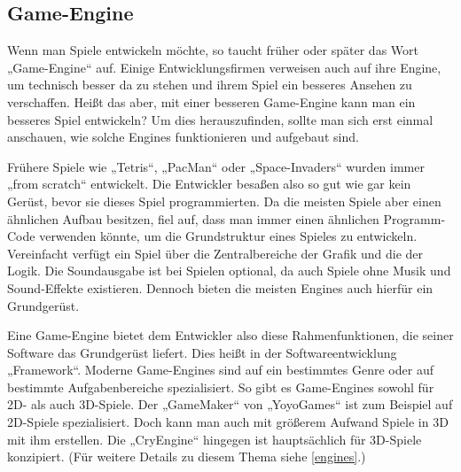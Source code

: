 \subsection{Game-Engine}	
\label{engine}
Wenn man Spiele entwickeln möchte, so taucht früher oder später das Wort „Game-Engine“ auf. Einige Entwicklungsfirmen verweisen auch auf ihre Engine, um technisch besser da zu stehen und ihrem Spiel ein besseres Ansehen zu verschaffen. Heißt das aber, mit einer besseren Game-Engine kann man ein besseres Spiel entwickeln? Um dies herauszufinden, sollte man sich erst einmal anschauen, wie solche Engines funktionieren und aufgebaut sind.

Frühere Spiele wie „Tetris“, „PacMan“ oder „Space-Invaders“ wurden immer „from scratch“  entwickelt. Die Entwickler besaßen also so gut wie gar kein Gerüst, bevor sie dieses Spiel programmierten. Da die meisten Spiele aber einen ähnlichen Aufbau besitzen, fiel auf, dass man immer einen ähnlichen Programm-Code verwenden könnte, um die Grundstruktur eines Spieles zu entwickeln. Vereinfacht verfügt ein Spiel über die Zentralbereiche der Grafik und die der Logik. Die Soundausgabe ist bei Spielen optional, da auch Spiele ohne Musik und Sound-Effekte existieren. Dennoch bieten die meisten Engines auch hierfür ein Grundgerüst.

Eine Game-Engine bietet dem Entwickler also diese Rahmenfunktionen, die seiner Software das Grundgerüst liefert. Dies heißt in der Softwareentwicklung „Framework“. 
Moderne Game-Engines sind auf ein bestimmtes Genre oder auf bestimmte Aufgabenbereiche spezialisiert. So gibt es Game-Engines sowohl für 2D- als auch 3D-Spiele. Der „GameMaker“ von „YoyoGames“ ist zum Beispiel auf 2D-Spiele spezialisiert. Doch kann man auch mit größerem Aufwand Spiele in 3D mit ihm erstellen.\cite{gamemaker} Die „CryEngine“ hingegen ist hauptsächlich für 3D-Spiele konzipiert.\cite{cryengine} (Für weitere Details zu diesem Thema siehe \ref{engines}.)
